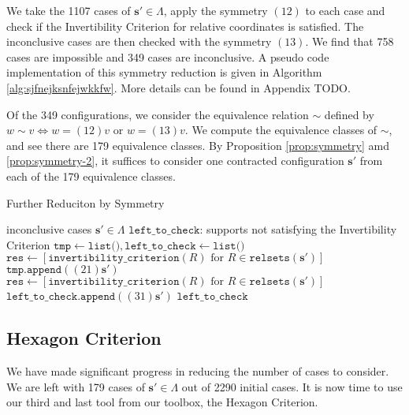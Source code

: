 We take the 1107 cases of \( \mathbf{s}' \in \Lambda \), apply the symmetry \( (12) \) to each case and check if the Invertibility Criterion for relative coordinates is satisfied. The inconclusive cases are then checked with the symmetry \( (13) \). We find that 758 cases are impossible and 349 cases are inconclusive. A pseudo code implementation of this symmetry reduction is given in Algorithm \ref{alg:sjfnejksnfejwkkfw}. More details can be found in Appendix TODO.

Of the 349 configurations, we consider the equivalence relation $\sim$ defined by $w \sim v \iff w = (12) v \text{ or } w = (13)v$. We compute the equivalence classes of $\sim$, and see there are 179 equivalence classes. By Proposition \ref{prop:symmetry} amd \ref{prop:symmetry-2}, it suffices to consider one contracted configuration \( \mathbf{s}' \) from each of the 179 equivalence classes. 

\begin{algorithm}
\caption{Further Reduciton by Symmetry}
\label{alg:sjfnejksnfejwkkfw}
\begin{algorithmic}[1]
 inconclusive cases $\mathbf{s}' \in \Lambda$
\Ensure $\texttt{left\_to\_check}$: supports not satisfying the Invertibility Criterion
\State $\texttt{tmp} \gets \texttt{list()}, \texttt{left\_to\_check} \gets \texttt{list()}$ 
    \State $\texttt{res} \gets [\texttt{invertibility\_criterion}(R) \text{ for } R \in \texttt{relsets}(\mathbf{s}')]$
        \State $\texttt{tmp.append}((21)\mathbf{s}')$
    \EndIf
\EndFor
{}
    \State $\texttt{res} \gets [\texttt{invertibility\_criterion}(R) \text{ for } R \in \texttt{relsets}(\mathbf{s}')]$
        \State $\texttt{left\_to\_check.append}((31)\mathbf{s}')$
    \EndIf
\EndFor
\State \Return $\texttt{left\_to\_check}$
\end{algorithmic}
\end{algorithm}

\subsection{Hexagon Criterion}

We have made significant progress in reducing the number of cases to consider. We are left with 179 cases of \( \mathbf{s}' \in \Lambda \) out of 2290 initial cases. It is now time to use our third and last tool from our toolbox, the Hexagon Criterion. 

